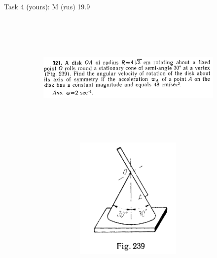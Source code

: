 \documentclass[aspectratio=169]{beamer}
\newcommand{\fbckg}[1]{\usebackgroundtemplate{\texttt{[image: \#1]}}}%
\begin{document}
\begin{frame}[t]{Task 4 (yours): M (rus) 19.9}
\framesubtitle{}
    \begin{figure}[H]
        \begin{subfigure}{0.79\textwidth}
            \centering\includegraphics[height=6cm,width=1\textwidth,keepaspectratio]{image12.png}
            \label{fig:image12}
        \end{subfigure}
        \begin{subfigure}{0.19\textwidth}
            \centering\includegraphics[height=6cm,width=1\textwidth,keepaspectratio]{image9.png}
            \label{fig:image9}
        \end{subfigure}
    \end{figure}
\end{frame}

\fbckg{fibeamer/figs/last_page.png}
\frame[plain]{}
\end{document}
